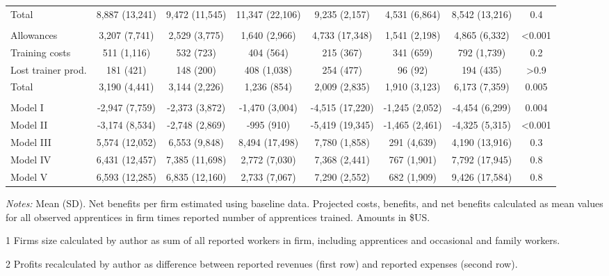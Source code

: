 \documentclass[
  a4paper, twoside, 12pt]{book}
\begin{document}
\begin{landscape}
\begin{table}[H]
{\begin{threeparttable}
\begin{tabular}[t]{lccccccc}
\hspace{1em}Total & 8,887 (13,241) & 9,472 (11,545) & 11,347 (22,106) & 9,235 (2,157) & 4,531 (6,864) & 8,542 (13,216) & 0.4\\
\addlinespace[0.3em]
\multicolumn{8}{l}{\textbf{Projected costs}}\\
\hspace{1em}Allowances & 3,207 (7,741) & 2,529 (3,775) & 1,640 (2,966) & 4,733 (17,348) & 1,541 (2,198) & 4,865 (6,332) & <0.001\\
\hspace{1em}Training costs & 511 (1,116) & 532 (723) & 404 (564) & 215 (367) & 341 (659) & 792 (1,739) & 0.2\\
\hspace{1em}Lost trainer prod. & 181 (421) & 148 (200) & 408 (1,038) & 254 (477) & 96 (92) & 194 (435) & >0.9\\
\hspace{1em}Total & 3,190 (4,441) & 3,144 (2,226) & 1,236 (854) & 2,009 (2,835) & 1,910 (3,123) & 6,173 (7,359) & 0.005\\
\addlinespace[0.3em]
\multicolumn{8}{l}{\textbf{Net benefits}}\\
\hspace{1em}Model I & -2,947 (7,759) & -2,373 (3,872) & -1,470 (3,004) & -4,515 (17,220) & -1,245 (2,052) & -4,454 (6,299) & 0.004\\
\hspace{1em}Model II & -3,174 (8,534) & -2,748 (2,869) & -995 (910) & -5,419 (19,345) & -1,465 (2,461) & -4,325 (5,315) & <0.001\\
\hspace{1em}Model III & 5,574 (12,052) & 6,553 (9,848) & 8,494 (17,498) & 7,780 (1,858) & 291 (4,639) & 4,190 (13,916) & 0.3\\
\hspace{1em}Model IV & 6,431 (12,457) & 7,385 (11,698) & 2,772 (7,030) & 7,368 (2,441) & 767 (1,901) & 7,792 (17,945) & 0.8\\
\hspace{1em}Model V & 6,593 (12,285) & 6,835 (12,160) & 2,733 (7,067) & 7,290 (2,552) & 682 (1,909) & 9,426 (17,584) & 0.8\\
\bottomrule
\end{tabular}
\begin{tablenotes}
\small
\item \textit{Notes:} Mean (SD). Net benefits per firm estimated using baseline data. 
Projected costs, benefits, and net benefits calculated as mean values for all observed apprentices in 
firm times reported number of apprentices trained. Amounts in \$US.
\item[1] Firms size calculated by author as sum of all reported workers in firm, including apprentices and occasional and family workers.
\item[2] Profits recalculated by author as difference between reported revenues (first row) and reported expenses (second row).
\end{tablenotes}
\end{threeparttable}}
\end{table}


\end{landscape}
\end{document}

